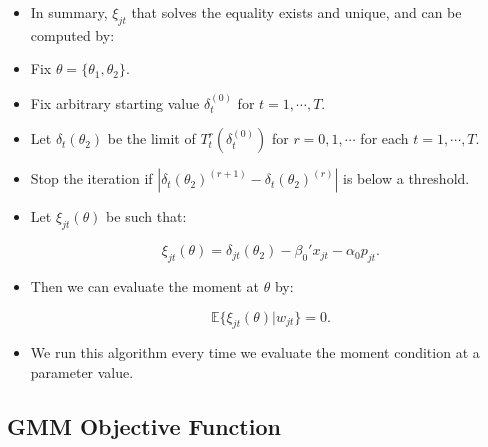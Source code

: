 \documentclass[]{book}
\providecommand{\tightlist}{%
  \setlength{\itemsep}{0pt}\setlength{\parskip}{0pt}}
\begin{document}
\begin{itemize}
\tightlist
\item
  In summary, \(\xi_{jt}\) that solves the equality exists and unique,
  and can be computed by:
\item
  Fix \(\theta = \{\theta_1, \theta_2\}\).
\item
  Fix arbitrary starting value \(\delta_t^{(0)}\) for
  \(t = 1, \cdots, T\).
\item
  Let \(\delta_t(\theta_2)\) be the limit of \(T_t^r(\delta_t^{(0)})\)
  for \(r = 0, 1, \cdots\) for each \(t = 1, \cdots, T\).
\item
  Stop the iteration if
  \(|\delta_t(\theta_2)^{(r + 1)} - \delta_t(\theta_2)^{(r)}|\) is below
  a threshold.
\item
  Let \(\xi_{jt}(\theta)\) be such that:

  \begin{equation}
  \xi_{jt}(\theta) = \delta_{jt}(\theta_2) - \beta_0' x_{jt} - \alpha_0 p_{jt}.
  \end{equation}
\item
  Then we can evaluate the moment at \(\theta\) by:

  \begin{equation}
  \mathbb{E}\{\xi_{jt}(\theta)|w_{jt}\} = 0.
  \end{equation}
\item
  We run this algorithm every time we evaluate the moment condition at a
  parameter value.
\end{itemize}

\subsection{GMM Objective Function}\label{gmm-objective-function}
\end{document}
